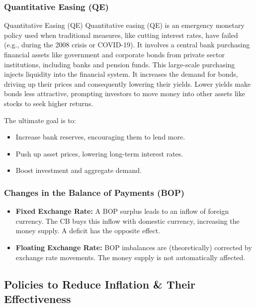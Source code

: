 \documentclass[11pt, a4paper, twoside]{book}
\begin{document}
\subsubsection{Quantitative Easing (QE)}

\begin{keyterm}{Quantitative Easing (QE)}
Quantitative easing (QE) is an emergency monetary policy used when traditional measures, like cutting interest rates, have failed (e.g., during the 2008 crisis or COVID-19). It involves a central bank purchasing financial assets like government and corporate bonds from private sector institutions, including banks and pension funds. This large-scale purchasing injects liquidity into the financial system. It increases the demand for bonds, driving up their prices and consequently lowering their yields. Lower yields make bonds less attractive, prompting investors to move money into other assets like stocks to seek higher returns.

The ultimate goal is to:
\begin{itemize}
  \item Increase bank reserves, encouraging them to lend more.
  \item Push up asset prices, lowering long-term interest rates.
  \item Boost investment and aggregate demand.
\end{itemize}
\end{keyterm}

\subsubsection{Changes in the Balance of Payments (BOP)}

\begin{itemize}
  \item \textbf{Fixed Exchange Rate:} A BOP surplus leads to an inflow of foreign currency. The CB buys this inflow with domestic currency, increasing the money supply. A deficit has the opposite effect.
  \item \textbf{Floating Exchange Rate:} BOP imbalances are (theoretically) corrected by exchange rate movements. The money supply is not automatically affected.
\end{itemize}

\subsection{Policies to Reduce Inflation \& Their Effectiveness}
\end{document}
